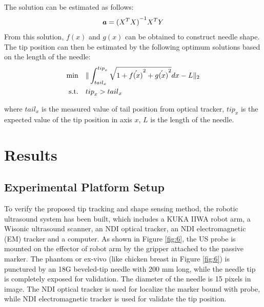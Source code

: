 \documentclass[journal,article,submit,moreauthors,pdftex]{Definitions/mdpi}
\begin{document}
The solution can be estimated as follows:
\begin{equation}
{\textbf{\textit{a}}}={(X^T X)}^{-1} X^T  Y
\end{equation}
From this solution, ${f(x)}$ and ${g(x)}$ can be obtained to construct needle shape. The tip position can then be estimated by the following optimum solutions based on the length of the needle:
\begin{equation}
\centering
\begin{aligned}
\textrm{min} \quad & \|\int_{{tail}_x}^{{tip}_x}\sqrt{1+{\acute{f(x)}}^2+{\acute{g(x)}}^2 }dx-L\|_2\\
\textrm{s.t.} \quad & {tip}_x>{tail}_x \\
\end{aligned}
\end{equation}

where ${{tail}_x}$ is the measured value of tail position from optical tracker, ${{tip}_x}$ is the expected value of the tip position in axis ${x}$, ${L}$ is the length of the needle.

\section{Results}
\subsection{Experimental Platform Setup}
To verify the proposed tip tracking and shape sensing method, the robotic ultrasound system has been built, which includes a KUKA IIWA robot arm, a Wisonic ultrasound scanner, an NDI optical tracker, an NDI electromagnetic (EM) tracker and a computer. As shown in Figure \ref{fig:6}, the US probe is mounted on the effector of robot arm by the gripper attached to the passive marker. The phantom or ex-vivo (like chicken breast in Figure \ref{fig:6}) is punctured by an 18G beveled-tip needle with 200 mm long, while the needle tip is completely exposed for validation.
The diameter of the needle is 15 pixels in image.
The NDI optical tracker is used for localize the marker bound with probe, while NDI electromagnetic tracker is used for validate the tip position.
\end{document}
